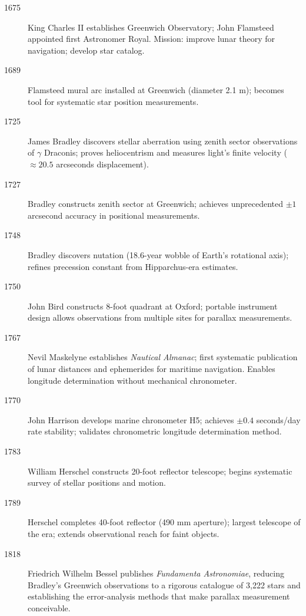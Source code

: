 \begin{description}
\item[1675] King Charles II establishes Greenwich Observatory; John Flamsteed appointed first Astronomer Royal. Mission: improve lunar theory for navigation; develop star catalog.

\item[1689] Flamsteed mural arc installed at Greenwich (diameter 2.1 m); becomes tool for systematic star position measurements.

\item[1725] James Bradley discovers stellar aberration using zenith sector observations of $\gamma$ Draconis; proves heliocentrism and measures light's finite velocity ($\approx 20.5$ arcseconds displacement).

\item[1727] Bradley constructs zenith sector at Greenwich; achieves unprecedented $\pm 1$ arcsecond accuracy in positional measurements.

\item[1748] Bradley discovers nutation (18.6-year wobble of Earth's rotational axis); refines precession constant from Hipparchus-era estimates.

\item[1750] John Bird constructs 8-foot quadrant at Oxford; portable instrument design allows observations from multiple sites for parallax measurements.

\item[1767] Nevil Maskelyne establishes \emph{Nautical Almanac}; first systematic publication of lunar distances and ephemerides for maritime navigation. Enables longitude determination without mechanical chronometer.

\item[1770] John Harrison develops marine chronometer H5; achieves $\pm 0.4$ seconds/day rate stability; validates chronometric longitude determination method.

\item[1783] William Herschel constructs 20-foot reflector telescope; begins systematic survey of stellar positions and motion.

\item[1789] Herschel completes 40-foot reflector (490 mm aperture); largest telescope of the era; extends observational reach for faint objects.

\item[1818] Friedrich Wilhelm Bessel publishes \emph{Fundamenta Astronomiae}, reducing Bradley's Greenwich observations to a rigorous catalogue of 3,222 stars and establishing the error-analysis methods that make parallax measurement conceivable.


\end{description}
